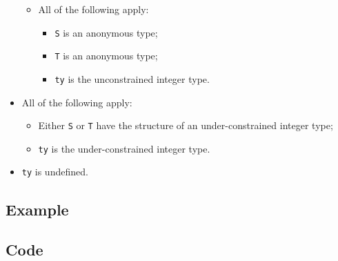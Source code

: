 \documentclass{book}
\begin{document}
\begin{itemize}
\begin{itemize}
      \item All of the following apply:
        \begin{itemize}
        \item \texttt{S} is an anonymous type;
        \item \texttt{T} is an anonymous type;
	\item \texttt{ty} is the unconstrained integer type. 
        \end{itemize}
    \end{itemize}

  \item All of the following apply:
    \begin{itemize}
    \item Either \texttt{S} or \texttt{T} have the structure of an under-constrained integer type;
    \item \texttt{ty} is the under-constrained integer type. 
    \end{itemize}

  \item \texttt{ty} is undefined.
  \end{itemize}

  \subsection{Example}

  \subsection{Code}
\end{document}
